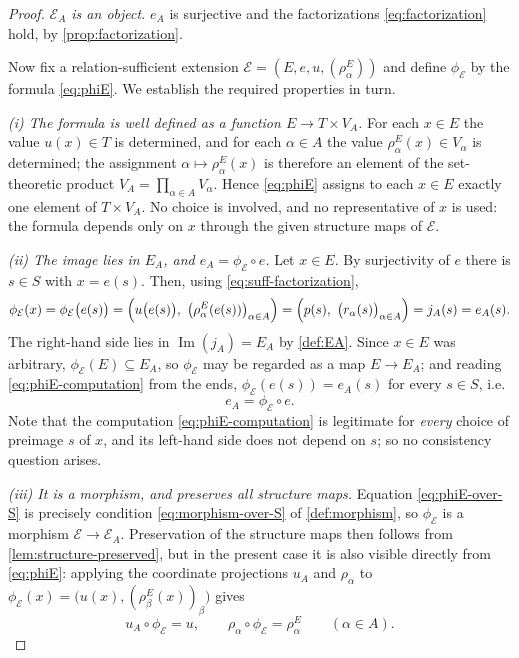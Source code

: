 \documentclass[11pt,reqno]{amsart}
\theoremstyle{plain}
\theoremstyle{definition}
\theoremstyle{remark}
\numberwithin{equation}{section}
\DeclareMathOperator{\Image}{Im}
\begin{document}
\begin{proof}
\emph{$\mathcal E_A$ is an object.} $e_A$ is surjective and the factorizations
\eqref{eq:factorization} hold, by \cref{prop:factorization}.

Now fix a relation-sufficient extension $\mathcal E=(E,e,u,(\rho_\alpha^E))$ and define
$\phi_{\mathcal E}$ by the formula \eqref{eq:phiE}. We establish the required properties in turn.

\smallskip
\emph{(i) The formula is well defined as a function $E\to T\times V_A$.} For each $x\in E$ the
value $u(x)\in T$ is determined, and for each $\alpha\in A$ the value $\rho_\alpha^E(x)\in V_\alpha$
is determined; the assignment $\alpha\mapsto\rho_\alpha^E(x)$ is therefore an element of the
set-theoretic product $V_A=\prod_{\alpha\in A}V_\alpha$. Hence \eqref{eq:phiE} assigns to each
$x\in E$ exactly one element of $T\times V_A$. No choice is involved, and no representative of $x$
is used: the formula depends only on $x$ through the given structure maps of $\mathcal E$.

\smallskip
\emph{(ii) The image lies in $E_A$, and $e_A=\phi_{\mathcal E}\circ e$.} Let $x\in E$. By
surjectivity of $e$ there is $s\in S$ with $x=e(s)$. Then, using
\eqref{eq:suff-factorization},
\begin{equation}
\label{eq:phiE-computation}
\phi_{\mathcal E}(x)
=\phi_{\mathcal E}\bigl(e(s)\bigr)
=\Bigl(u\bigl(e(s)\bigr),\ \bigl(\rho_\alpha^E(e(s))\bigr)_{\alpha\in A}\Bigr)
=\Bigl(p(s),\ \bigl(r_\alpha(s)\bigr)_{\alpha\in A}\Bigr)
=j_A(s)
=e_A(s).
\end{equation}
The right-hand side lies in $\Image(j_A)=E_A$ by \cref{def:EA}. Since $x\in E$ was arbitrary,
$\phi_{\mathcal E}(E)\subseteq E_A$, so $\phi_{\mathcal E}$ may be regarded as a map $E\to E_A$; and
reading \eqref{eq:phiE-computation} from the ends, $\phi_{\mathcal E}(e(s))=e_A(s)$ for every $s\in
S$, i.e.
\begin{equation}
\label{eq:phiE-over-S}
e_A=\phi_{\mathcal E}\circ e .
\end{equation}
Note that the computation \eqref{eq:phiE-computation} is legitimate for \emph{every} choice of
preimage $s$ of $x$, and its left-hand side does not depend on $s$; so no consistency question
arises.

\smallskip
\emph{(iii) It is a morphism, and preserves all structure maps.} Equation \eqref{eq:phiE-over-S} is
precisely condition \eqref{eq:morphism-over-S} of \cref{def:morphism}, so $\phi_{\mathcal E}$ is a
morphism $\mathcal E\to\mathcal E_A$. Preservation of the structure maps then follows from
\cref{lem:structure-preserved}, but in the present case it is also visible directly from
\eqref{eq:phiE}: applying the coordinate projections $u_A$ and $\rho_\alpha$ to
$\phi_{\mathcal E}(x)=\bigl(u(x),(\rho_\beta^E(x))_\beta\bigr)$ gives
\begin{equation}
\label{eq:phiE-structure}
u_A\circ\phi_{\mathcal E}=u,
\qquad
\rho_\alpha\circ\phi_{\mathcal E}=\rho_\alpha^E
\qquad(\alpha\in A).
\end{equation}


\end{proof}
\end{document}
